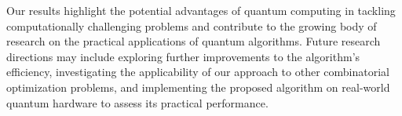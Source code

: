 Our results highlight the potential advantages of quantum computing in tackling computationally challenging problems and contribute to the growing body of research on the practical applications of quantum algorithms. Future research directions may include exploring further improvements to the algorithm's efficiency, investigating the applicability of our approach to other combinatorial optimization problems, and implementing the proposed algorithm on real-world quantum hardware to assess its practical performance.




